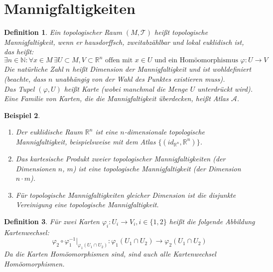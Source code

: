 \documentclass[a4paper]{scrreprt}
\numberwithin{equation}{chapter}
\newcommand{\R}{\mathds{R}}
\theoremstyle{plain}
\newtheorem{defn}{Definition}[section]
\newtheorem{bsp}[defn]{Beispiel}
\begin{document}
	\section{Mannigfaltigkeiten}
		\begin{defn}
			Ein topologischer Raum $(M,\mathcal{T})$ heißt topologische Mannigfaltigkeit, wenn er hausdorffsch, zweitabzählbar und lokal euklidisch ist, das heißt:
			\begin{equation*}
				\exists n\in \mathds{N}: \forall x\in M\, \exists U\subset M, V\subset \R^n\text{ offen mit } x\in U \text{ und ein Homöomorphismus } \varphi:U\rightarrow V
			\end{equation*}
			Die natürliche Zahl $n$ heißt Dimension der Mannigfaltigkeit und ist wohldefiniert (beachte, dass $n$ unabhängig von der Wahl des Punktes existieren muss).\\
			Das Tupel $(\varphi,U)$ heißt Karte (wobei manchmal die Menge $U$ unterdrückt wird). Eine Familie von Karten, die die Mannigfaltigkeit überdecken, heißt Atlas $\mathcal{A}$.
		\end{defn}
		\begin{bsp}\hfill 
			\begin{enumerate}
				\item Der euklidische Raum $\R^n$ ist eine $n$-dimensionale topologische Mannigfaltigkeit, beispielsweise mit dem Atlas $\lbrace (id_{\R^n},\R^n)\rbrace$. 
				\item Das kartesische Produkt zweier topologischer Mannigfaltigkeiten (der Dimensionen $n$, $m$) ist eine topologische Mannigfaltigkeit (der Dimension $n\cdot m$).
				\item Für topologische Mannigfaltigkeiten gleicher Dimension ist die disjunkte Vereinigung eine topologische Mannigfaltigkeit.
			\end{enumerate}
		\end{bsp}
		\begin{defn}
			Für zwei Karten $\varphi_i:U_i\rightarrow V_i, i\in\lbrace 1,2 \rbrace$ heißt die folgende Abbildung Kartenwechsel:
			\begin{equation*}
				\varphi_2\circ\varphi_1^{-1}\vert_{\varphi_1(U_1\cap U_2)}:\varphi_1(U_1\cap U_2)\rightarrow \varphi_2(U_1\cap U_2)
			\end{equation*}
			Da die Karten Homöomorphismen sind, sind auch alle Kartenwechsel Homöomorphismen.
		\end{defn} 
\end{document}

